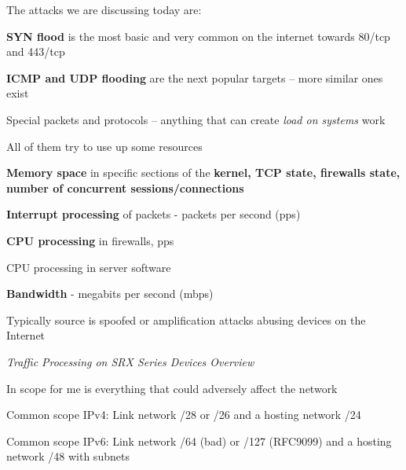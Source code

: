 \documentclass[Screen16to9,17pt]{foils}
\begin{document}
The attacks we are discussing today are:
\begin{list2}
\item {\bf SYN flood} is the most basic and very common on the internet towards 80/tcp and 443/tcp
\item {\bf ICMP and UDP flooding} are the next popular targets -- more similar ones exist
\item Special packets and protocols -- anything that can create \emph{load on systems} work
\item All of them try to use up some resources
\begin{list2}
\item {\bf Memory space} in specific sections of the {\bf kernel, TCP state, firewalls state, number of concurrent sessions/connections}
\item {\bf Interrupt processing} of packets - packets per second (pps)
\item {\bf CPU processing} in firewalls, pps
\item CPU processing in server software
\item {\bf Bandwidth} - megabits per second (mbps)
\item Typically source is spoofed or amplification attacks abusing devices on the Internet
\end{list2}
\end{list2}






\emph{Traffic Processing on SRX Series Devices Overview}\\ {\scriptsize
{}}







\begin{list2}
\item In scope for me is everything that could adversely affect the network
\item Common scope IPv4: Link network /28 or /26 and a hosting network /24
\item Common scope IPv6: Link network /64 (bad) or /127 (RFC9099) and a hosting network /48 with subnets
\end{list2}
\end{document}
